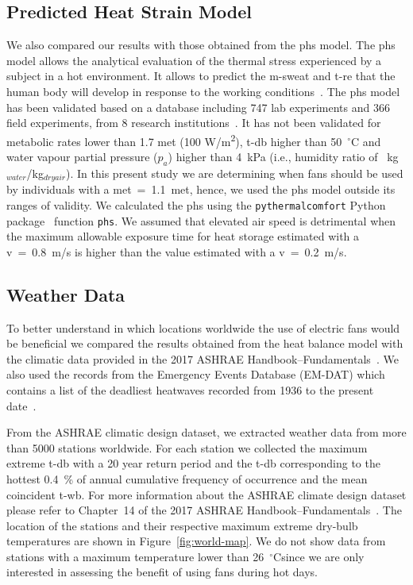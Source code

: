 \subsection{Predicted Heat Strain Model}\label{subsec:predicted-heat-strain-model}

We also compared our results with those obtained from the \ac{phs} model.
The \ac{phs} model allows the analytical evaluation of the thermal stress experienced by a subject in a hot environment.
It allows to predict the \ac{m-sweat} and \ac{t-re} that the human body will develop in response to the working conditions~\cite{iso7933}.
The \ac{phs} model has been validated based on a database including 747 lab experiments and 366 field experiments, from 8 research institutions~\cite{iso7933}.
It has not been validated for metabolic rates lower than 1.7 met (100 W/m\textsuperscript{2}), \ac{t-db} higher than 50~$^{\circ}$C and water vapour partial pressure ($p_{a}$) higher than 4~kPa (i.e., humidity ratio of ~kg$_{water}$/kg$_{dry air}$).
In this present study we are determining when fans should be used by individuals with a \ac{met}~=~1.1~met, hence, we used the \ac{phs} model outside its ranges of validity.
We calculated the \ac{phs} using the \verb|pythermalcomfort| Python package~\cite{Tartarini2020a} function \verb|phs|.
We assumed that elevated air speed is detrimental when the maximum allowable exposure time for heat storage estimated with a \ac{v}~=~0.8~m/s is higher than the value estimated with a \ac{v}~=~0.2~m/s.

\subsection{Weather Data}\label{subsec:weather-data}

To better understand in which locations worldwide the use of electric fans would be beneficial we compared the results obtained from the heat balance model with the climatic data provided in the 2017 ASHRAE Handbook--Fundamentals~\cite{ASHRA2017}.
We also used the records from the Emergency Events Database (EM-DAT) which contains a list of the deadliest heatwaves recorded from 1936 to the present date~\cite{EMDATThe70:online}.

From the ASHRAE climatic design dataset, we extracted weather data from more than 5000 stations worldwide.
For each station we collected the maximum extreme \ac{t-db} with a 20 year return period
and the \ac{t-db} corresponding to the hottest 0.4~\% of annual cumulative frequency of occurrence and the mean coincident \ac{t-wb}.
For more information about the ASHRAE climate design dataset please refer to Chapter~14 of the 2017 ASHRAE Handbook--Fundamentals~\cite{ASHRA2017}.
The location of the stations and their respective maximum extreme dry-bulb temperatures are shown in Figure~\ref{fig:world-map}.
We do not show data from stations with a maximum temperature lower than 26~$^\circ$C\@ since we are only interested in assessing the benefit of using fans during hot days.

